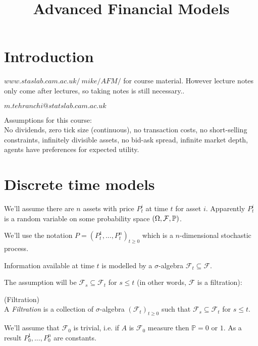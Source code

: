 \documentclass[a4paper]{article}
\begin{document}
\title{Advanced Financial Models}

\maketitle

\newpage

\tableofcontents

\newpage

\section{Introduction}

$www.staslab.cam.ac.uk/~mike/AFM/$ for course material. However lecture notes only come after lectures, so taking notes is still necessary..

$m.tehranchi@statslab.cam.ac.uk$

Assumptions for this course:\\
No dividends, zero tick size (continuous), no transaction costs, no short-selling constraints, infinitely divisible assets, no bid-ask spread, infinite market depth, agents have preferences for expected utility.

\newpage

\section{Discrete time models}

We'll assume there are $n$ assets with price $P_t^i$ at time $t$ for asset $i$. Apparently $P_t^i$ is a random variable on some probability space $(\Omega,\mathcal{F},\P)$.

We'll use the notation $P=(P_t^1,...,P_t^n)_{t \geq 0}$ which is a $n$-dimensional stochastic process.

Information available at time $t$ is modelled by a $\sigma$-algebra $\mathcal{F}_t \subseteq \mathcal{F}$.

The assumption will be $\mathcal{F}_s \subseteq \mathcal{F}_t$ for $s \leq t$ (in other words, $\mathcal{F}$ is a filtration):

\begin{defi} (Filtration)\\
A \emph{Filtration} is a collection of $\sigma$-algebra $(\mathcal{F}_t)_{t \geq 0}$ such that $\mathcal{F}_s \subseteq \mathcal{F}_t$ for $s \leq t$.
\end{defi}

We'll assume that $\mathcal{F}_0$ is trivial, i.e. if $A$ is $\mathcal{F}_0$ measure then $\mathbb{P} = 0$ or $1$. As a result $P_0^1,...,P_0^n$ are constants.
\end{document}

